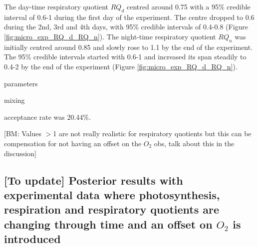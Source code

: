 \documentclass{ruthesis}
\begin{document}
The day-time respiratory quotient $RQ_d$ centred around 0.75 with a 95\% credible interval of 0.6-1 during the first day of the experiment. The centre dropped to 0.6 during the 2nd, 3rd and 4th days, with 95\% credible intervals of 0.4-0.8 (Figure \ref{fig:micro_exp_RQ_d_RQ_n}). The night-time respiratory quotient $RQ_n$ was initially centred around 0.85 and slowly rose to 1.1 by the end of the experiment. The 95\% credible intervals started with 0.6-1 and increased its span steadily to 0.4-2 by the end of the experiment (Figure \ref{fig:micro_exp_RQ_d_RQ_n}).

parameters

mixing

acceptance rate was 20.44\%.


[BM: Values $>$1 are not really realistic for respiratory quotients but this can be compensation for not having an offset on the $O_2$ obs, talk about this in the discussion]





\FloatBarrier
\subsection{[To update] Posterior results with experimental data where photosynthesis, respiration and respiratory quotients are changing through time and an offset on $O_2$ is introduced}
\end{document}
